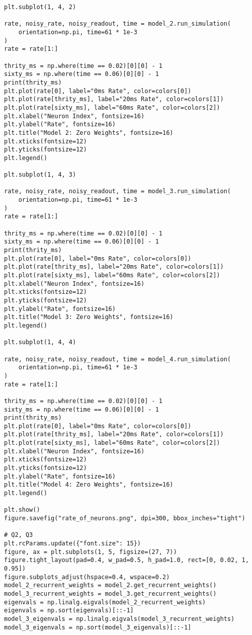 \documentclass[a4paper, 11pt, oneside]{report}
\begin{document}
\begin{verbatim}
plt.subplot(1, 4, 2)

rate, noisy_rate, noisy_readout, time = model_2.run_simulation(
    orientation=np.pi, time=61 * 1e-3
)
rate = rate[1:]

thrity_ms = np.where(time == 0.02)[0][0] - 1
sixty_ms = np.where(time == 0.06)[0][0] - 1
print(thrity_ms)
plt.plot(rate[0], label="0ms Rate", color=colors[0])
plt.plot(rate[thrity_ms], label="20ms Rate", color=colors[1])
plt.plot(rate[sixty_ms], label="60ms Rate", color=colors[2])
plt.xlabel("Neuron Index", fontsize=16)
plt.ylabel("Rate", fontsize=16)
plt.title("Model 2: Zero Weights", fontsize=16)
plt.xticks(fontsize=12)
plt.yticks(fontsize=12)
plt.legend()

plt.subplot(1, 4, 3)

rate, noisy_rate, noisy_readout, time = model_3.run_simulation(
    orientation=np.pi, time=61 * 1e-3
)
rate = rate[1:]

thrity_ms = np.where(time == 0.02)[0][0] - 1
sixty_ms = np.where(time == 0.06)[0][0] - 1
print(thrity_ms)
plt.plot(rate[0], label="0ms Rate", color=colors[0])
plt.plot(rate[thrity_ms], label="20ms Rate", color=colors[1])
plt.plot(rate[sixty_ms], label="60ms Rate", color=colors[2])
plt.xlabel("Neuron Index", fontsize=16)
plt.xticks(fontsize=12)
plt.yticks(fontsize=12)
plt.ylabel("Rate", fontsize=16)
plt.title("Model 3: Zero Weights", fontsize=16)
plt.legend()

plt.subplot(1, 4, 4)

rate, noisy_rate, noisy_readout, time = model_4.run_simulation(
    orientation=np.pi, time=61 * 1e-3
)
rate = rate[1:]

thrity_ms = np.where(time == 0.02)[0][0] - 1
sixty_ms = np.where(time == 0.06)[0][0] - 1
print(thrity_ms)
plt.plot(rate[0], label="0ms Rate", color=colors[0])
plt.plot(rate[thrity_ms], label="20ms Rate", color=colors[1])
plt.plot(rate[sixty_ms], label="60ms Rate", color=colors[2])
plt.xlabel("Neuron Index", fontsize=16)
plt.xticks(fontsize=12)
plt.yticks(fontsize=12)
plt.ylabel("Rate", fontsize=16)
plt.title("Model 4: Zero Weights", fontsize=16)
plt.legend()

plt.show()
figure.savefig("rate_of_neurons.png", dpi=300, bbox_inches="tight")

# Q2, Q3
plt.rcParams.update({"font.size": 15})
figure, ax = plt.subplots(1, 5, figsize=(27, 7))
figure.tight_layout(pad=0.4, w_pad=0.5, h_pad=1.0, rect=[0, 0.02, 1, 0.95])
figure.subplots_adjust(hspace=0.4, wspace=0.2)
model_2_recurrent_weights = model_2.get_recurrent_weights()
model_3_recurrent_weights = model_3.get_recurrent_weights()
eigenvals = np.linalg.eigvals(model_2_recurrent_weights)
eigenvals = np.sort(eigenvals)[::-1]
model_3_eigenvals = np.linalg.eigvals(model_3_recurrent_weights)
model_3_eigenvals = np.sort(model_3_eigenvals)[::-1]


\end{verbatim}
\end{document}
